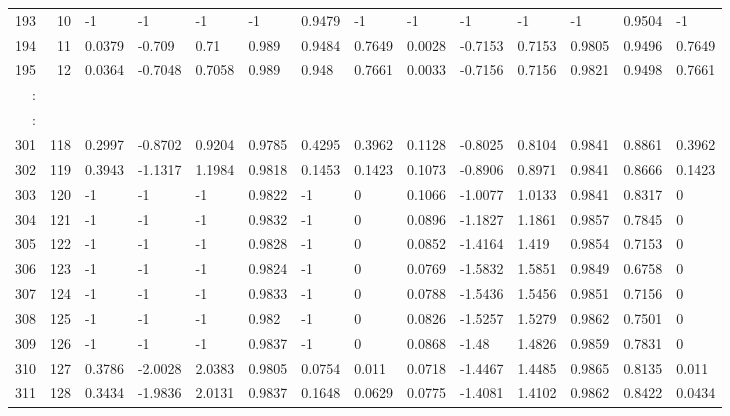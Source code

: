 \begin{table}[p]
{\begin{minipage}{\textheight}
\begin{tabular}{rr||lll|lll||lll|lll}
 193    & 10   & -1      & -1      & -1     & -1     & 0.9479 & -1     & -1      & -1      & -1     & -1     & 0.9504 & -1     \\
 194    & 11   & 0.0379  & -0.709  & 0.71   & 0.989  & 0.9484 & 0.7649 & 0.0028  & -0.7153 & 0.7153 & 0.9805 & 0.9496 & 0.7649 \\
 195    & 12   & 0.0364  & -0.7048 & 0.7058 & 0.989  & 0.948  & 0.7661 & 0.0033  & -0.7156 & 0.7156 & 0.9821 & 0.9498 & 0.7661 \\
 :      &      &         &         &        &        &        &        &         &         &        &        &        &        \\
 \hline
 :      &      &         &         &        &        &        &        &         &         &        &        &        &        \\
 301    & 118  & 0.2997  & -0.8702 & 0.9204 & 0.9785 & 0.4295 & 0.3962 & 0.1128  & -0.8025 & 0.8104 & 0.9841 & 0.8861 & 0.3962 \\
 302    & 119  & 0.3943  & -1.1317 & 1.1984 & 0.9818 & 0.1453 & 0.1423 & 0.1073  & -0.8906 & 0.8971 & 0.9841 & 0.8666 & 0.1423 \\
 303    & 120  & -1      & -1      & -1     & 0.9822 & -1     & 0      & 0.1066  & -1.0077 & 1.0133 & 0.9841 & 0.8317 & 0      \\
 304    & 121  & -1      & -1      & -1     & 0.9832 & -1     & 0      & 0.0896  & -1.1827 & 1.1861 & 0.9857 & 0.7845 & 0      \\
 305    & 122  & -1      & -1      & -1     & 0.9828 & -1     & 0      & 0.0852  & -1.4164 & 1.419  & 0.9854 & 0.7153 & 0      \\
 306    & 123  & -1      & -1      & -1     & 0.9824 & -1     & 0      & 0.0769  & -1.5832 & 1.5851 & 0.9849 & 0.6758 & 0      \\
 307    & 124  & -1      & -1      & -1     & 0.9833 & -1     & 0      & 0.0788  & -1.5436 & 1.5456 & 0.9851 & 0.7156 & 0      \\
 308    & 125  & -1      & -1      & -1     & 0.982  & -1     & 0      & 0.0826  & -1.5257 & 1.5279 & 0.9862 & 0.7501 & 0      \\
 309    & 126  & -1      & -1      & -1     & 0.9837 & -1     & 0      & 0.0868  & -1.48   & 1.4826 & 0.9859 & 0.7831 & 0      \\
 310    & 127  & 0.3786  & -2.0028 & 2.0383 & 0.9805 & 0.0754 & 0.011  & 0.0718  & -1.4467 & 1.4485 & 0.9865 & 0.8135 & 0.011  \\
 311    & 128  & 0.3434  & -1.9836 & 2.0131 & 0.9837 & 0.1648 & 0.0629 & 0.0775  & -1.4081 & 1.4102 & 0.9862 & 0.8422 & 0.0434 \\

\end{tabular}
\end{minipage}}
\end{table}
